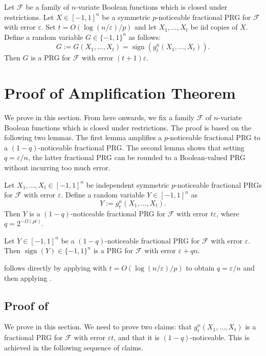 \documentclass{toc}
\newcommand{\FF}{\mathcal{F}}
\newcommand{\eps}{\varepsilon}
\DeclareMathOperator{\sign}{sign}     %
\begin{document}
\begin{theorem}
\label{thm:main}
Let $\FF$ be a family of $n$-variate Boolean functions which is closed under restrictions.
Let $X \in [-1,1]^n$ be a symmetric $p$-noticeable fractional PRG for $\FF$ with error $\eps$. Set $t=O(\log(n/\eps)/p)$ and let $X_1,\ldots,X_t$
be iid copies of $X$. Define a random variable $G \in \{-1,1\}^n$ as follows:
$$
G:=G(X_1,\ldots,X_t) = \sign(g_t^n(X_1,\ldots,X_t)).
$$
Then $G$ is a PRG for $\FF$ with error $(t+1)\eps$.
\end{theorem}


\section{Proof of Amplification Theorem}
\label{sec:proof_main}
We prove  in this section. {}From here onwards, we fix a family $\FF$ of $n$-variate Boolean functions which is closed under restrictions.
The proof is based on the following two lemmas.
The first lemma amplifies a $p$-noticeable fractional PRG to a $(1-q)$-noticeable fractional PRG\@. The second
lemma shows that setting $q=\eps/n$, the latter fractional PRG can be rounded to a Boolean-valued PRG without incurring
too much error.

\begin{lemma}
\label{lemma:amplify}
Let $X_1,\ldots,X_t \in [-1,1]^n$ be independent symmetric $p$-noticeable fractional PRGs for $\FF$ with error $\eps$.
Define a random variable $Y \in [-1,1]^n$ as
$$
Y:=g_t^n(X_1,\ldots,X_t).
$$
Then $Y$ is a $(1-q)$-noticeable fractional PRG for $\FF$ with error $t\eps$, where $q=2^{-\Omega(pt)}$.
\end{lemma}

\begin{lemma}
\label{lemma:round}
Let $Y \in [-1,1]^n$ be a $(1-q)$-noticeable fractional PRG for $\FF$ with error $\eps$.
Then $\sign(Y) \in \{-1,1\}^n$ is a PRG for $\FF$ with error $\eps+qn$.
\end{lemma}

 follows directly by applying  with $t=O(\log(n/\eps)/p)$ to obtain
$q=\eps/n$ and then applying .

\subsection{Proof of }
We prove  in this section. We need to prove two claims: that $g_t^n(X_1,\ldots,X_t)$ is a fractional
PRG for $\FF$ with error $\eps t$, and that it is $(1-q)$-noticeable. This is achieved in the following sequence of claims.
\end{document}
